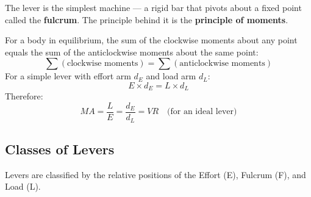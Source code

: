 The lever is the simplest machine --- a rigid bar
that pivots about a fixed point called the
\textbf{fulcrum}. The principle behind it is the
\textbf{principle of moments}.

\begin{lawbox}
For a body in equilibrium, the sum of the clockwise
moments about any point equals the sum of the
anticlockwise moments about the same point:
\[
  \sum (\text{clockwise moments})
  = \sum (\text{anticlockwise moments})
\]
For a simple lever with effort arm $d_E$ and load
arm $d_L$:
\[
  E \times d_E = L \times d_L
\]
Therefore:
\[
  MA = \frac{L}{E} = \frac{d_E}{d_L} = VR
  \quad \text{(for an ideal lever)}
\]
\end{lawbox}

\subsection{Classes of Levers}

Levers are classified by the relative positions of
the Effort (E), Fulcrum (F), and Load (L).

